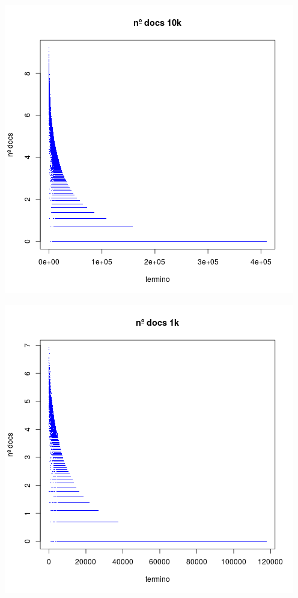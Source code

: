 \begin{center}\includegraphics{img/numdocs10k.png}
\end{center}
\begin{center}\includegraphics{img/numdocs1k.png}
\end{center}
